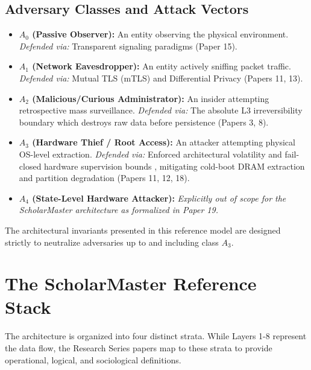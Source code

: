 \documentclass[conference]{IEEEtran}
\begin{document}
\subsection{Adversary Classes and Attack Vectors}
\begin{itemize}
    \item \textbf{$A_0$ (Passive Observer):} An entity observing the physical environment. \textit{Defended via:} Transparent signaling paradigms (Paper 15).
    \item \textbf{$A_1$ (Network Eavesdropper):} An entity actively sniffing packet traffic. \textit{Defended via:} Mutual TLS (mTLS) and Differential Privacy \cite{b_dwork, b_abadi} (Papers 11, 13).
    \item \textbf{$A_2$ (Malicious/Curious Administrator):} An insider attempting retrospective mass surveillance. \textit{Defended via:} The absolute L3 irreversibility boundary which destroys raw data before persistence (Papers 3, 8).
    \item \textbf{$A_3$ (Hardware Thief / Root Access):} An attacker attempting physical OS-level extraction. \textit{Defended via:} Enforced architectural volatility and fail-closed hardware supervision bounds \cite{b_avizienis}, mitigating cold-boot DRAM extraction \cite{b_halderman} and partition degradation \cite{b_brewer} (Papers 11, 12, 18).
    \item \textbf{$A_4$ (State-Level Hardware Attacker):} \textit{Explicitly out of scope for the ScholarMaster architecture as formalized in Paper 19.}
\end{itemize}

The architectural invariants presented in this reference model are designed strictly to neutralize adversaries up to and including class $A_3$.

\section{The ScholarMaster Reference Stack}

The architecture is organized into four distinct strata. While Layers 1-8 represent the data flow, the Research Series papers map to these strata to provide operational, logical, and sociological definitions.
\end{document}
